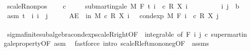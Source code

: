 \begin{isabellebody}
\isadelimproof
\isanewline
%
\endisadelimproof
\isanewline
{}\isamarkupfalse%
\ scaleR{\isacharunderscore}{\kern0pt}nonpos{\isacharcolon}{\kern0pt}\ \isanewline
\ \ \ {\isachardoublequoteopen}c\ {\isasymle}\ {}{\isachardoublequoteclose}\isanewline
\ \ \ {\isachardoublequoteopen}submartingale\ M\ F\ t\ {\isacharparenleft}{\kern0pt}{\isasymlambda}i\ {\isasymxi}{\isachardot}{\kern0pt}\ c\ {\isacharasterisk}{\kern0pt}\isactrlsub R\ X\ i\ {\isasymxi}{\isacharparenright}{\kern0pt}{\isachardoublequoteclose}\isanewline
%
\isadelimproof
%
\endisadelimproof
%
\isatagproof
{}\isamarkupfalse%
\isanewline
\ \ \isacommand{{\isacharbraceleft}{\kern0pt}}\isamarkupfalse%
\isanewline
\ \ \ \ \isamarkupfalse%
\ i\ j\ {\isacharcolon}{\kern0pt}{\isacharcolon}{\kern0pt}\ {\isacharprime}{\kern0pt}b\ \isamarkupfalse%
\ asm{\isacharcolon}{\kern0pt}\ {\isachardoublequoteopen}t\ {\isasymle}\ i{\isachardoublequoteclose}\ {\isachardoublequoteopen}i\ {\isasymle}\ j{\isachardoublequoteclose}\isanewline
\ \ \ \ \isamarkupfalse%
\ {\isachardoublequoteopen}AE\ {\isasymxi}\ in\ M{\isachardot}{\kern0pt}\ c\ {\isacharasterisk}{\kern0pt}\isactrlsub R\ X\ i\ {\isasymxi}\ {\isasymle}\ cond{\isacharunderscore}{\kern0pt}exp\ M\ {\isacharparenleft}{\kern0pt}F\ i{\isacharparenright}{\kern0pt}\ {\isacharparenleft}{\kern0pt}{\isasymlambda}{\isasymxi}{\isachardot}{\kern0pt}\ c\ {\isacharasterisk}{\kern0pt}\isactrlsub R\ X\ j\ {\isasymxi}{\isacharparenright}{\kern0pt}\ {\isasymxi}{\isachardoublequoteclose}\ \isanewline
\ \ \ \ \ \ \isamarkupfalse%
\ sigma{\isacharunderscore}{\kern0pt}finite{\isacharunderscore}{\kern0pt}subalgebra{\isachardot}{\kern0pt}cond{\isacharunderscore}{\kern0pt}exp{\isacharunderscore}{\kern0pt}scaleR{\isacharunderscore}{\kern0pt}right{\isacharbrackleft}{\kern0pt}OF\ {\isacharunderscore}{\kern0pt}\ integrable{\isacharcomma}{\kern0pt}\ of\ {\isachardoublequoteopen}F\ i{\isachardoublequoteclose}\ j\ c{\isacharbrackright}{\kern0pt}\ supermartingale{\isacharunderscore}{\kern0pt}property{\isacharbrackleft}{\kern0pt}OF\ asm{\isacharbrackright}{\kern0pt}\ \isamarkupfalse%
\ {\isacharparenleft}{\kern0pt}fastforce\ intro{\isacharbang}{\kern0pt}{\isacharcolon}{\kern0pt}\ scaleR{\isacharunderscore}{\kern0pt}left{\isacharunderscore}{\kern0pt}mono{\isacharunderscore}{\kern0pt}neg{\isacharbrackleft}{\kern0pt}OF\ {\isacharunderscore}{\kern0pt}\ assms{\isacharbrackright}{\kern0pt}{\isacharparenright}{\kern0pt}\isanewline

\end{isabellebody}
